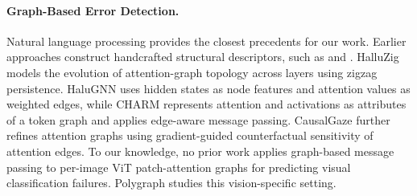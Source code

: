 \documentclass[11pt]{article}
\begin{document}
\paragraph{Graph-Based Error Detection.}
Natural language processing provides the closest precedents for our work. Earlier approaches construct handcrafted structural descriptors, such as  \citet{Kushnareva2021} and \citet{Binkowski2025}. HalluZig \citep{Samaga2026} models the evolution of attention-graph topology across layers using zigzag persistence. HaluGNN \citep{Kong2026b} uses hidden states as node features and attention values as weighted edges, while CHARM \citep{Frasca2026} represents attention and activations as attributes of a token graph and applies edge-aware message passing. CausalGaze \citep{Kong2026a} further refines attention graphs using gradient-guided counterfactual sensitivity of attention edges. To our knowledge, no prior work applies graph-based message passing to per-image ViT patch-attention graphs for predicting visual classification failures. Polygraph studies this vision-specific setting.





\end{document}
